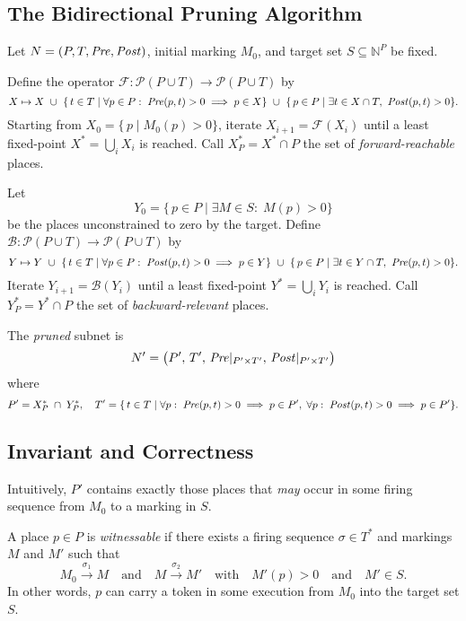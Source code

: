 \subsection{The Bidirectional Pruning Algorithm}

Let $N=(P,T,\mathit{Pre},\mathit{Post})$, initial marking $M_0$, and target set
$S\subseteq\mathbb{N}^P$ be fixed.

\begin{definition}
	Define the operator $\mathcal{F}:\mathcal{P}(P\cup T)\to\mathcal{P}(P\cup T)$ by
	\[
	X \mapsto X
	~\cup~
	\{\,t\in T \mid \forall p\in P:\; \mathit{Pre}(p,t)>0 \implies p\in X\}
	~\cup~
	\{\,p\in P \mid \exists t\in X\cap T,\ \mathit{Post}(p,t)>0\}.
	\]
	Starting from $X_0 = \{\,p\mid M_0(p)>0\}$, iterate
	$X_{i+1} = \mathcal{F}(X_i)$ until a least fixed-point
	$X^*=\bigcup_i X_i$ is reached.  Call $X^*_P = X^*\cap P$ the set of
	\emph{forward-reachable} places.
\end{definition}

\begin{definition}
	Let
	\[
	Y_0 = \{\,p\in P \mid \exists M\in S:\;M(p)>0\}
	\]
	be the places unconstrained to zero by the target.  Define
	$\mathcal{B}:\mathcal{P}(P\cup T)\to\mathcal{P}(P\cup T)$ by
	\[
	Y \mapsto Y
	~\cup~
	\{\,t\in T \mid \forall p\in P:\; \mathit{Post}(p,t)>0 \implies p\in Y\}
	~\cup~
	\{\,p\in P \mid \exists t\in Y\cap T,\ \mathit{Pre}(p,t)>0\}.
	\]
	Iterate $Y_{i+1} = \mathcal{B}(Y_i)$ until a least fixed-point
	$Y^*=\bigcup_i Y_i$ is reached.  Call $Y^*_P = Y^*\cap P$ the set of
	\emph{backward-relevant} places.
\end{definition}

\begin{definition}
	The \emph{pruned} subnet is
	\[
	N' = \bigl(P',\,T',\,\mathit{Pre}|_{P'\times T'},\,\mathit{Post}|_{P'\times T'}\bigr)
	\]
	where
	\[
	P' = X^*_P \;\cap\; Y^*_P,
	\quad
	T' = \{\,t\in T \mid
	\forall p:\;\mathit{Pre}(p,t)>0\implies p\in P',\;
	\forall p:\;\mathit{Post}(p,t)>0\implies p\in P'
	\}.
	\]
\end{definition}

\subsection{Invariant and Correctness}

Intuitively, $P'$ contains exactly those places that
\emph{may} occur in some firing sequence from $M_0$ to a marking in $S$.

\begin{definition}
	A place $p\in P$ is \emph{witnessable} if there exists a firing
	sequence $\sigma\in T^*$ and markings $M$ and $M'$ such that
	\[
	M_0 \xrightarrow{\sigma_1} M
	\quad\text{and}\quad
	M \xrightarrow{\sigma_2} M'
	\quad\text{with}\quad
	M'(p)>0
	\quad\text{and}\quad
	M'\in S.
	\]
	In other words, $p$ can carry a token in some execution from $M_0$ into the target set $S$.
\end{definition}

